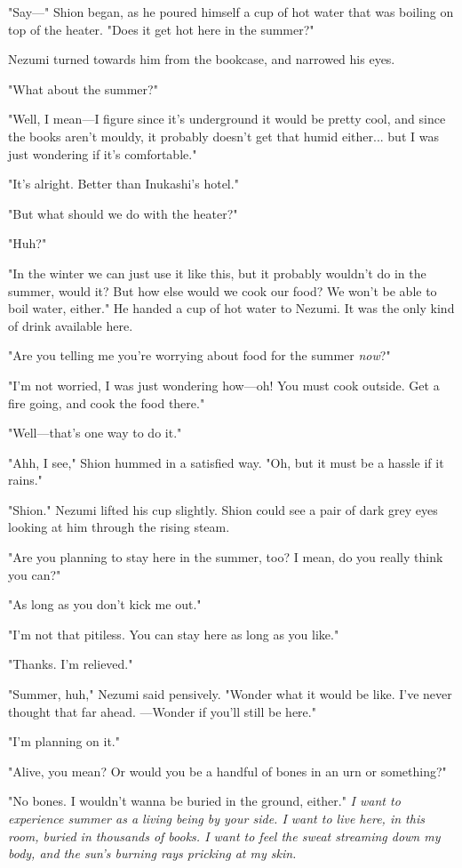 "Say---" Shion began, as he poured himself a cup of hot water that was
boiling on top of the heater. "Does it get hot here in the summer?"

Nezumi turned towards him from the bookcase, and narrowed his eyes.

"What about the summer?"

"Well, I mean---I figure since it's underground it would be pretty cool,
and since the books aren't mouldy, it probably doesn't get that humid
either... but I was just wondering if it's comfortable."

"It's alright. Better than Inukashi's hotel."

"But what should we do with the heater?"

"Huh?"

"In the winter we can just use it like this, but it probably wouldn't do
in the summer, would it? But how else would we cook our food? We won't
be able to boil water, either." He handed a cup of hot water to Nezumi.
It was the only kind of drink available here.

"Are you telling me you're worrying about food for the summer \emph{now}?"

"I'm not worried, I was just wondering how---oh! You must cook outside.
Get a fire going, and cook the food there."

"Well---that's one way to do it."

"Ahh, I see," Shion hummed in a satisfied way. "Oh, but it must be a
hassle if it rains."

"Shion." Nezumi lifted his cup slightly. Shion could see a pair of dark
grey eyes looking at him through the rising steam.

"Are you planning to stay here in the summer, too? I mean, do you really
think you can?"

"As long as you don't kick me out."

"I'm not that pitiless. You can stay here as long as you like."

"Thanks. I'm relieved."

"Summer, huh," Nezumi said pensively. "Wonder what it would be like.
I've never thought that far ahead. ---Wonder if you'll still be here."

"I'm planning on it."

"Alive, you mean? Or would you be a handful of bones in an urn or
something?"

"No bones. I wouldn't wanna be buried in the ground, either." \emph{I want to
experience summer as a living being by your side. I want to live here,
in this room, buried in thousands of books. I want to feel the sweat
streaming down my body, and the sun's burning rays pricking at my skin.}

